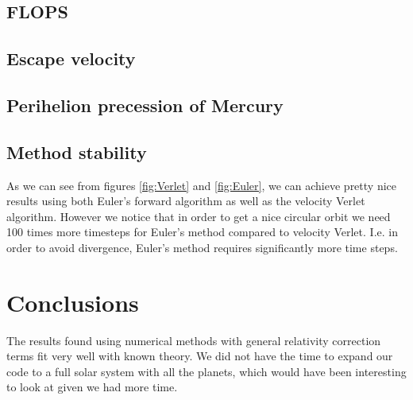 \documentclass[a4paper, fontsize=11pt]{article}
\begin{document}
\subsection{FLOPS}




\subsection{Escape velocity}






\subsection{Perihelion precession of Mercury}




\subsection{Method stability} 




As we can see from figures \ref{fig:Verlet} and \ref{fig:Euler}, we can achieve pretty nice results using both Euler's forward algorithm as well as the velocity Verlet algorithm. However we notice that in order to get a nice circular orbit we need 100 times more timesteps for Euler's method compared to velocity Verlet. I.e. in order to avoid divergence, Euler's method requires significantly more time steps.



\section{Conclusions}

The results found using numerical methods with general relativity correction terms fit very well with known theory. We did not have the time to expand our code to a full solar system with all the planets, which would have been interesting to look at given we had more time.




\end{document}
